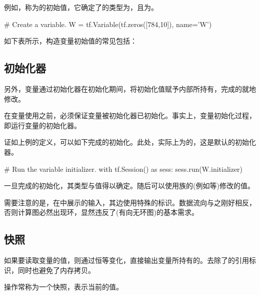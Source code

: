 \begin{content}
例如，称为的初始值，它确定了的类型为，且为\code{[784, 10]}。

\begin{leftbar}
\begin{python}
# Create a variable.
W = tf.Variable(tf.zeros([784,10]), name='W')
\end{python}
\end{leftbar}

如下表所示，构造变量初始值的常见包括：

\subsection{初始化器}

另外，变量通过初始化器在初始化期间，将初始化值赋予内部所持有，完成的就地修改。

在变量使用之前，必须保证变量被初始化器已初始化。事实上，变量初始化过程，即运行变量的初始化器。

证如上例的定义，可以如下完成的初始化。此处，实际上为的，这是默认的初始化器。

\begin{leftbar}
\begin{python}
# Run the variable initializer.
with tf.Session() as sess:
  sess.run(W.initializer)
\end{python}
\end{leftbar}

一旦完成的初始化，其类型与值得以确定。随后可以使用族的(例如等)修改的值。

需要注意的是，在中展示的输入，其边使用特殊的标识。数据流向与之刚好相反，否则计算图必然出现环，显然违反了(有向无环图)的基本需求。

\subsection{快照}

如果要读取变量的值，则通过恒等变化，直接输出变量所持有的。去除了的引用标识，同时也避免了内存拷贝。

操作常称为一个快照，表示当前的值。


\end{content}
